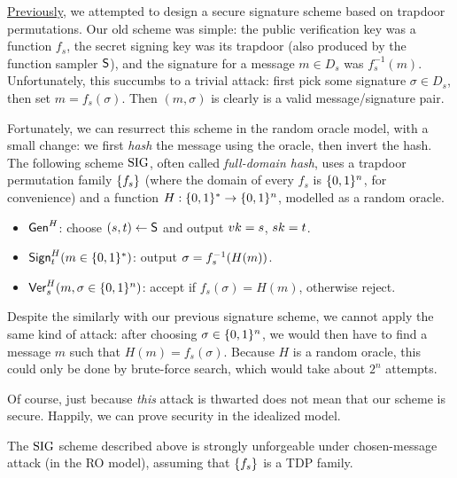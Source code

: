 \documentclass[11pt]{article}
\begin{document}
\href{https://github.com/cpeikert/TheoryOfCryptography/blob/master/lec12.pdf}{Previously},
we attempted to design a secure signature scheme based on trapdoor
permutations.  Our old scheme was simple: the public verification key
was a function $f_{s}$, the secret signing key was its trapdoor (also
produced by the function sampler $\mathsf{S}$), and the signature for a
message $m \in D_{s}$ was $f_{s}^{-1}(m)$.  Unfortunately, this
succumbs to a trivial attack: first pick some signature $\sigma \in
D_{s}$, then set $m=f_s(\sigma)$.  Then $(m,\sigma)$ is clearly is a
valid message/signature pair.

Fortunately, we can resurrect this scheme in the random oracle model,
with a small change: we first \emph{hash} the message using the
oracle, then invert the hash.  The following scheme $\text{SIG}$, often
called \emph{full-domain hash}, uses a trapdoor permutation family
$\{f_{s}\}$ (where the domain of every $f_{s}$ is $\{0,1\}^{n}$, for
convenience) and a function $H : \{0,1\}^{*} \to \{0,1\}^{n}$, modelled as a
random oracle.
\begin{itemize}
\item $\mathsf{Gen}^{H}$: choose $(s,t) \gets \mathsf{S}$ and output $vk=s$,
  $sk=t$.
\item $\mathsf{Sign}^{H}_{t}(m \in \{0,1\}^{*})$: output $\sigma =
  f_s^{-1}\parens*{H(m)}$.
\item $\mathsf{Ver}^{H}_{s}(m,\sigma \in \{0,1\}^{n})$: accept if
  $f_s(\sigma)=H(m)$, otherwise reject.
\end{itemize}

Despite the similarly with our previous signature scheme, we cannot
apply the same kind of attack: after choosing $\sigma \in \{0,1\}^{n}$,
we would then have to find a message $m$ such that $H(m) =
f_{s}(\sigma)$.  Because $H$ is a random oracle, this could only be
done by brute-force search, which would take about $2^{n}$ attempts.

Of course, just because \emph{this} attack is thwarted does not mean
that our scheme is secure.  Happily, we can prove security in the
idealized model.

\begin{theorem}
  \label{thm:fdh-uf-cma}
  The $\text{SIG}$ scheme described above is strongly unforgeable under
  chosen-message attack (in the RO model), assuming that $\{f_{s}\}$
  is a TDP family.
\end{theorem}
\end{document}
